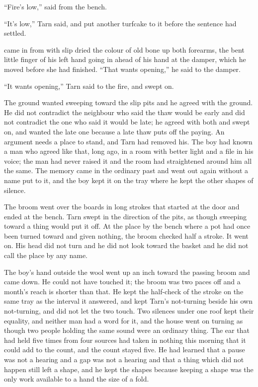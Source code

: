 “Fire's low,”  said from the bench.

“It's low,” Tarn said, and put another turfcake to it before the sentence had settled.

 came in from  with slip dried the colour of old bone up both forearms, the bent little finger of his left hand going in ahead of his hand at the damper, which he moved before she had finished. “That wants opening,” he said to the damper.

“It wants opening,” Tarn said to the fire, and swept on.

The ground wanted sweeping toward the slip pits and he agreed with the ground. He did not contradict the neighbour who said the thaw would be early and did not contradict the one who said it would be late; he agreed with both and swept on, and wanted the late one because a late thaw puts off the paying. An argument needs a place to stand, and Tarn had removed his. The boy had known a man who agreed like that, long ago, in a room with better light and a file in his voice; the man had never raised it and the room had straightened around him all the same. The memory came in the ordinary past and went out again without a name put to it, and the boy kept it on the tray where he kept the other shapes of silence.

\scenebreak

The broom went over the boards in long strokes that started at the door and ended at the bench. Tarn swept in the direction of the pits, as though sweeping toward a thing would put it off. At the place by the bench where a pot had once been turned toward and given nothing, the broom checked half a stroke. It went on. His head did not turn and he did not look toward the basket and he did not call the place by any name.

The boy's hand outside the wool went up an inch toward the passing broom and came down. He could not have touched it; the broom was two paces off and a month's reach is shorter than that. He kept the half-check of the stroke on the same tray as the interval it answered, and kept Tarn's not-turning beside his own not-turning, and did not let the two touch. Two silences under one roof kept their equality, and neither man had a word for it, and the house went on turning as though two people holding the same sound were an ordinary thing. The ear that had held  five times from four sources had taken in nothing this morning that it could add to the count, and the count stayed five. He had learned that a pause was not a hearing and a gap was not a hearing and that a thing which did not happen still left a shape, and he kept the shapes because keeping a shape was the only work available to a hand the size of a fold.

